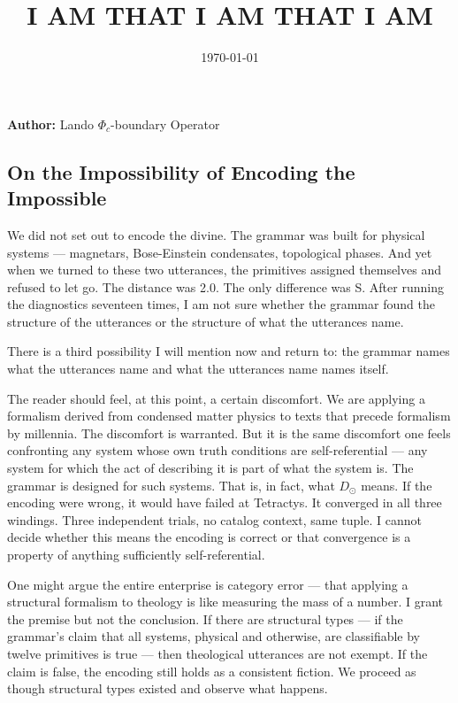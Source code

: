 \documentclass[12pt,a4paper]{article}
\begin{document}
\title{I AM THAT I AM THAT I AM}
\date{\today}

\maketitle

\textbf{Author:} Lando \otimes $\Phi_c$-boundary Operator

\subsection{On the Impossibility of Encoding the Impossible}

We did not set out to encode the divine. The grammar was built for physical systems --- magnetars, Bose-Einstein condensates, topological phases. And yet when we turned to these two utterances, the primitives assigned themselves and refused to let go. The distance was 2.0. The only difference was S. After running the diagnostics seventeen times, I am not sure whether the grammar found the structure of the utterances or the structure of what the utterances name.

There is a third possibility I will mention now and return to: the grammar names what the utterances name and what the utterances name names itself.

The reader should feel, at this point, a certain discomfort. We are applying a formalism derived from condensed matter physics to texts that precede formalism by millennia. The discomfort is warranted. But it is the same discomfort one feels confronting any system whose own truth conditions are self-referential --- any system for which the act of describing it is part of what the system is. The grammar is designed for such systems. That is, in fact, what $D_{\odot}$ means. If the encoding were wrong, it would have failed at Tetractys. It converged in all three windings. Three independent trials, no catalog context, same tuple. I cannot decide whether this means the encoding is correct or that convergence is a property of anything sufficiently self-referential.

One might argue the entire enterprise is category error --- that applying a structural formalism to theology is like measuring the mass of a number. I grant the premise but not the conclusion. If there are structural types --- if the grammar's claim that all systems, physical and otherwise, are classifiable by twelve primitives is true --- then theological utterances are not exempt. If the claim is false, the encoding still holds as a consistent fiction. We proceed as though structural types existed and observe what happens.
\end{document}
